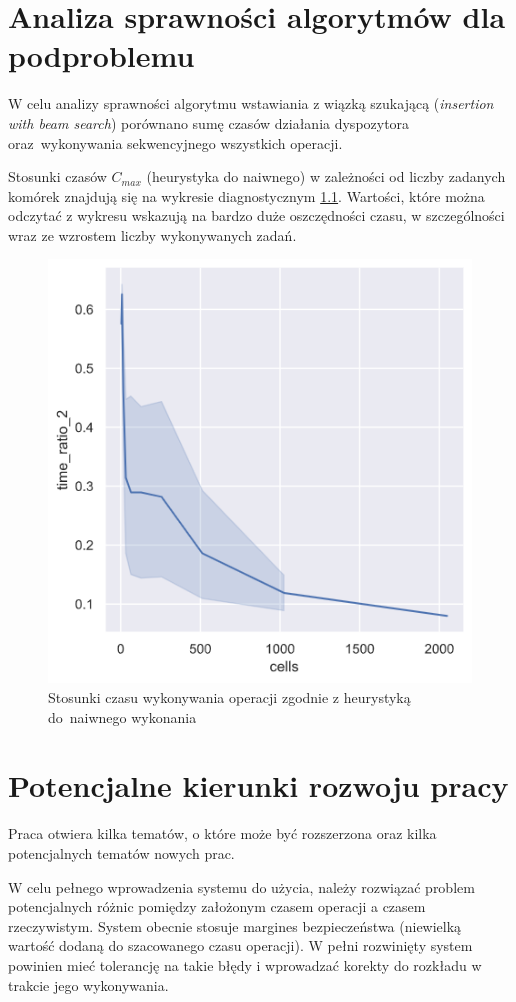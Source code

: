 \documentclass[brudnopis]{xmgr}
\begin{document}
\chapter{Analiza sprawności algorytmów dla podproblemu}

W celu analizy sprawności algorytmu wstawiania z wiązką szukającą (\emph{insertion with beam search}) porównano sumę czasów działania dyspozytora oraz~wykonywania sekwencyjnego wszystkich operacji.

Stosunki czasów $C_{max}$ (heurystyka do naiwnego) w zależności od liczby zadanych komórek znajdują się na wykresie diagnostycznym \ref{diag:time_ratio_2}. Wartości, które można odczytać z wykresu wskazują na bardzo duże oszczędności czasu, w szczególności wraz ze wzrostem liczby wykonywanych zadań.

\begin{figure}[!tbh]
\centering
\includegraphics[width=.7\hsize]{fig/time_ratio_2.png}
\caption{Stosunki czasu wykonywania operacji zgodnie z heurystyką do~naiwnego wykonania \label{diag:time_ratio_2}}
\end{figure}\medskip



\chapter{Potencjalne kierunki rozwoju pracy} \label{chap:extend}

Praca otwiera kilka tematów, o które może być rozszerzona oraz kilka potencjalnych tematów nowych prac.
\medskip

W celu pełnego wprowadzenia systemu do użycia, należy rozwiązać problem potencjalnych różnic pomiędzy założonym czasem operacji a czasem rzeczywistym. System obecnie stosuje margines bezpieczeństwa (niewielką wartość dodaną do szacowanego czasu operacji).
W pełni rozwinięty system powinien mieć tolerancję na takie błędy i wprowadzać korekty do rozkładu w trakcie jego wykonywania.
\medskip
\end{document}

